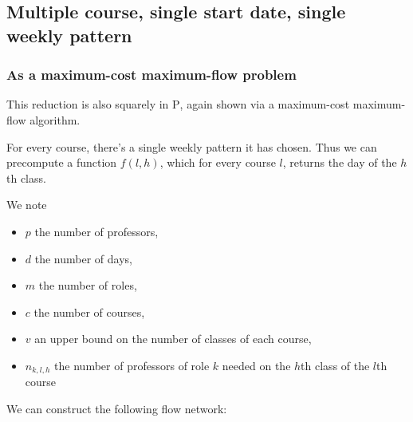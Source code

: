 \subsection{Multiple course, single start date, single weekly pattern}

\subsubsection{As a maximum-cost maximum-flow problem}
This reduction is also squarely in \textsc{P}, again shown via a maximum-cost maximum-flow algorithm.

For every course, there's a single weekly pattern it has chosen. Thus we can precompute a function $f(l, h)$, which for every course $l$, returns the day of the $h$th class.

We note
\begin{itemize}
  \item $p$ the number of professors,
  \item $d$ the number of days,
  \item $m$ the number of roles,
  \item $c$ the number of courses,
  \item $v$ an upper bound on the number of classes of each course,
  \item $n_{k, l, h}$ the number of professors of role $k$ needed on the $h$th class of the $l$th course
\end{itemize}

We can construct the following flow network:


